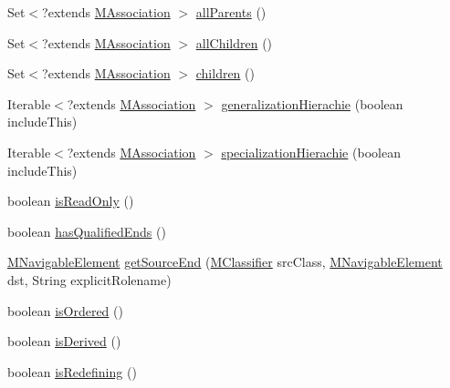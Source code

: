\begin{DoxyCompactItemize}
\item 
Set$<$?extends \hyperlink{interfaceorg_1_1tzi_1_1use_1_1uml_1_1mm_1_1_m_association}{M\-Association} $>$ \hyperlink{interfaceorg_1_1tzi_1_1use_1_1uml_1_1mm_1_1_m_association_a6f14e3cf453b35ca2397b2512567386b}{all\-Parents} ()
\item 
Set$<$?extends \hyperlink{interfaceorg_1_1tzi_1_1use_1_1uml_1_1mm_1_1_m_association}{M\-Association} $>$ \hyperlink{interfaceorg_1_1tzi_1_1use_1_1uml_1_1mm_1_1_m_association_aa2288b63d96f9ce4732ce1a4efad6033}{all\-Children} ()
\item 
Set$<$?extends \hyperlink{interfaceorg_1_1tzi_1_1use_1_1uml_1_1mm_1_1_m_association}{M\-Association} $>$ \hyperlink{interfaceorg_1_1tzi_1_1use_1_1uml_1_1mm_1_1_m_association_a9081322d5a7a1575b1364761ef97d7bf}{children} ()
\item 
Iterable$<$?extends \hyperlink{interfaceorg_1_1tzi_1_1use_1_1uml_1_1mm_1_1_m_association}{M\-Association} $>$ \hyperlink{interfaceorg_1_1tzi_1_1use_1_1uml_1_1mm_1_1_m_association_aa2fff26fe123beb704adf86ca54f6b54}{generalization\-Hierachie} (boolean include\-This)
\item 
Iterable$<$?extends \hyperlink{interfaceorg_1_1tzi_1_1use_1_1uml_1_1mm_1_1_m_association}{M\-Association} $>$ \hyperlink{interfaceorg_1_1tzi_1_1use_1_1uml_1_1mm_1_1_m_association_a5b5d6e453fcfdf11173d2c51da63e3a0}{specialization\-Hierachie} (boolean include\-This)
\item 
boolean \hyperlink{interfaceorg_1_1tzi_1_1use_1_1uml_1_1mm_1_1_m_association_a2919031c2a334fd6bebe396f337ac69d}{is\-Read\-Only} ()
\item 
boolean \hyperlink{interfaceorg_1_1tzi_1_1use_1_1uml_1_1mm_1_1_m_association_a3459fcb369a9bbdf769e6ed31d7f4526}{has\-Qualified\-Ends} ()
\item 
\hyperlink{interfaceorg_1_1tzi_1_1use_1_1uml_1_1mm_1_1_m_navigable_element}{M\-Navigable\-Element} \hyperlink{interfaceorg_1_1tzi_1_1use_1_1uml_1_1mm_1_1_m_association_ad4b06dd9d6f5f1063a6810d5e03dc5dc}{get\-Source\-End} (\hyperlink{interfaceorg_1_1tzi_1_1use_1_1uml_1_1mm_1_1_m_classifier}{M\-Classifier} src\-Class, \hyperlink{interfaceorg_1_1tzi_1_1use_1_1uml_1_1mm_1_1_m_navigable_element}{M\-Navigable\-Element} dst, String explicit\-Rolename)
\item 
boolean \hyperlink{interfaceorg_1_1tzi_1_1use_1_1uml_1_1mm_1_1_m_association_a7f6681d1778b1de5bda0ab60b373f860}{is\-Ordered} ()
\item 
boolean \hyperlink{interfaceorg_1_1tzi_1_1use_1_1uml_1_1mm_1_1_m_association_a8c203c298b2cc094c81c19786bed763b}{is\-Derived} ()
\item 
boolean \hyperlink{interfaceorg_1_1tzi_1_1use_1_1uml_1_1mm_1_1_m_association_adb5a39ed6ab09a73621e209073b23ade}{is\-Redefining} ()
\end{DoxyCompactItemize}


